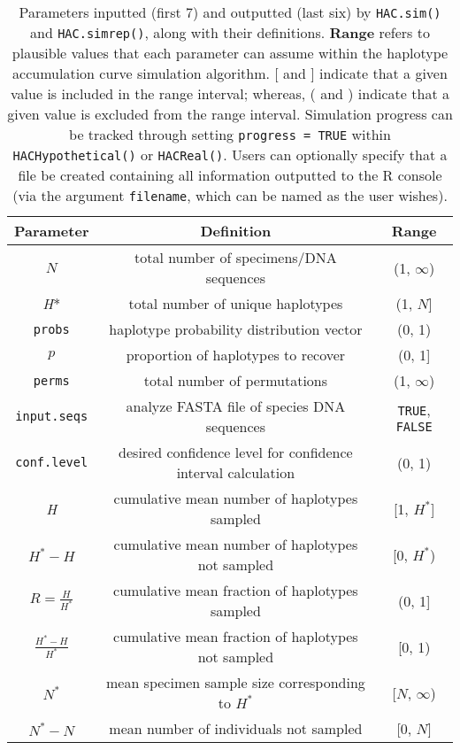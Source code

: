\begin{table}[H]

\centering

\caption{Parameters inputted (first 7) and outputted (last six) by {\tt HAC.sim()} and {\tt HAC.simrep()}, along with their definitions. \textbf{Range} refers to plausible values that each parameter can assume within the haplotype accumulation curve simulation algorithm. [ and ] indicate that a given value is included in the range interval; whereas, ( and  ) indicate that a given value is excluded from the range interval. Simulation progress can be tracked through setting {\tt progress = TRUE} within {\tt HACHypothetical()} or {\tt HACReal()}. Users can optionally specify that a file be created containing all information outputted to the R console (via the argument {\tt filename}, which can be named as the user wishes).} 

\begin{tabular}{ccc} \hline

\textbf{Parameter} & \textbf{Definition} & \textbf{Range} \\ \hline
$N$ & total number of specimens/DNA sequences & (1, $\infty$) \\ 
\textit{H}* & total number of unique haplotypes & (1, $N$] \\ 
{\tt probs} & haplotype probability distribution vector & (0, 1) \\ 
$p$ & proportion of haplotypes to recover & (0, 1] \\ 
{\tt perms} & total number of permutations & (1, $\infty$)\\
{\tt input.seqs} & analyze FASTA file of species DNA sequences & {\tt TRUE}, {\tt FALSE} \\  
{\tt conf.level} & desired confidence level for confidence interval calculation & (0, 1) \\ 
\textit{H} & cumulative mean number of haplotypes sampled & [1, $H^*$] \\ 
$H^* - H$ & cumulative mean number of haplotypes not sampled & [0, $H^*$) \\ 
$R = \frac{H}{H^*}$ & cumulative mean fraction of haplotypes sampled & (0, 1] \\ 
$\frac{H^*-H}{H^*}$ & cumulative mean fraction of haplotypes not sampled & [0, 1) \\ 
$N^*$ & mean specimen sample size corresponding to $H^*$  & [$N$, $\infty$) \\ 
$N^*-N$ & mean number of individuals not sampled & [0, $N$] \\ 

\end{tabular}

\end{table}


